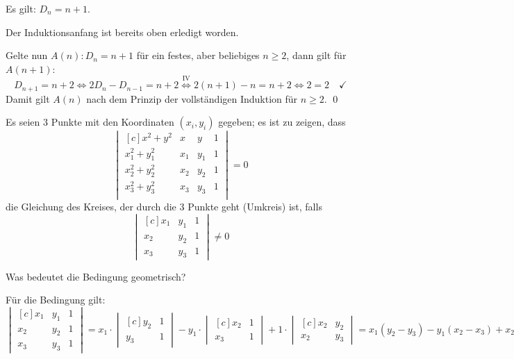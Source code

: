 \documentclass[answers]{exam}
\newcommand{\dvektor}[1]{\begin{vmatrix*}[c] #1 \end{vmatrix*}}
\begin{document}
\begin{questions}
\begin{parts}
\begin{solution}
            Es gilt: $D_n = n+1$.

            Der Induktionsanfang ist bereits oben erledigt worden.

            Gelte nun $A(n) : D_n = n+1$ für ein festes, aber beliebiges $n \geq 2$, dann gilt für $A(n+1)$:
            $$
                D_{n+1} = n + 2 \iff 2 D_n - D_{n-1} = n+2 \overset{\text{IV}}{\iff} 2(n+1) - n = n + 2 \iff 2 = 2 \quad \checkmark
            $$
            Damit gilt $A(n)$ nach dem Prinzip der vollständigen Induktion für $n \geq 2$. \qed
        \end{solution}
    \end{parts}

    \newpage
    \question
    Es seien 3 Punkte mit den Koordinaten $(x_i, y_i)$ gegeben; es ist zu zeigen, dass
    $$
        \dvektor{
            x^2 + y^2 & x & y & 1 \\
            x_1^2 + y_1^2 & x_1 & y_1 & 1 \\
            x_2^2 + y_2^2 & x_2 & y_2 & 1 \\
            x_3^2 + y_3^2 & x_3 & y_3 & 1 \\
        }
        = 0
    $$
    die Gleichung des Kreises, der durch die 3 Punkte geht (Umkreis) ist, falls
    $$
        \dvektor{
            x_1 & y_1 & 1 \\
            x_2 & y_2 & 1 \\
            x_3 & y_3 & 1
        }
        \neq 0
    $$

    Was bedeutet die Bedingung geometrisch?
    \begin{solution}
        Für die Bedingung gilt:
        $$
            \dvektor{
                x_1 & y_1 & 1 \\
                x_2 & y_2 & 1 \\
                x_3 & y_3 & 1
            }
            =
            x_1 \cdot \dvektor{y_2 & 1 \\ y_3 & 1} - y_1 \cdot \dvektor{x_2 & 1 \\ x_3 & 1} + 1 \cdot \dvektor{x_2 & y_2 \\ x_2 & y_3} = x_1(y_2 - y_3) - y_1(x_2 - x_3) + x_2y_3 - x_2y_3
        $$
    \end{solution}
\end{questions}
\end{document}
